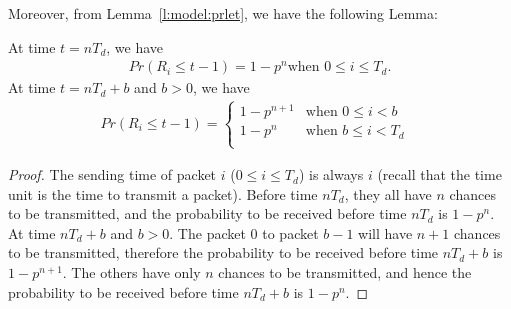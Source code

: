     Moreover, from Lemma~\ref{l:model:prlet}, we have the following Lemma: 
    \begin{lemma}
    \label{l:model:recv_td}
    At time $t = nT_d$, we have
    \begin{eqnarray*}
    Pr(R_i \leq t - 1) = 1 - p^n \textrm{when $0 \leq i \le T_d$.}
    \end{eqnarray*}
    At time $t = nT_d + b$ and $b>0$, we have
    \begin{eqnarray*}
        Pr(R_i \le t-1) = \left\{\begin{array}{ll}
        1 - p^{n+1} & \textrm{when $0 \le i < b$}\\
        1 - p^n     & \textrm{when $b \le i < T_d$ }\\
        \end{array}\right.
    \end{eqnarray*}
    \end{lemma}
    \begin{proof}
    The sending time of packet $i$ ($ 0 \leq i \le T_d$) 
    is always $i$ (recall that the time unit is the time to transmit a packet). Before time $nT_d$, 
    they all have $n$ chances to be transmitted, and the probability to
    be received before time $nT_d$ is $1 - p^n$.
    At time $nT_d + b$ and $b >0$. The packet $0$ to packet $b-1$ will
    have $n+1$ chances to be transmitted, therefore the probability to be
    received before time $nT_d + b$ is $1 - p^{n+1}$. The others have only
    $n$ chances to be transmitted, and hence the probability to be
    received before time $nT_d + b$ is $1-p^n$. 
    \end{proof}

